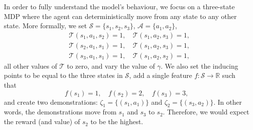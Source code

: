 \documentclass{mpaper}
\begin{document}
In order to fully understand the model's behaviour, we focus on a three-state
MDP where the agent can deterministically move from any state to any other
state. More formally, we set $\mathcal{S} = \{ s_1, s_2, s_3 \}$, $\mathcal{A} =
\{ a_1, a_2 \}$,
\begin{align*}
  &\mathcal{T}(s_1, a_1, s_2) = 1, \quad \mathcal{T}(s_1, a_2, s_3) = 1, \\
  &\mathcal{T}(s_2, a_1, s_1) = 1, \quad \mathcal{T}(s_1, a_2, s_3) = 1, \\
  &\mathcal{T}(s_3, a_1, s_1) = 1, \quad \mathcal{T}(s_1, a_2, s_2) = 1,
\end{align*}
all other values of $\mathcal{T}$ to zero, and vary the value of $\gamma$. We
also set the inducing points to be equal to the three states in $\mathcal{S}$,
add a single feature $f : \mathcal{S} \to \mathbb{R}$ such that
\[
  f(s_1) = 1, \quad f(s_2) = 2, \quad f(s_3) = 3,
\]
and create two demonstrations: $\zeta_1 = \{ (s_1, a_1) \}$ and $\zeta_2 = \{
(s_3, a_2) \}$. In other words, the demonstrations move from $s_1$ and $s_3$ to
$s_2$. Therefore, we would expect the reward (and value) of $s_2$ to be the
highest.
\end{document}
